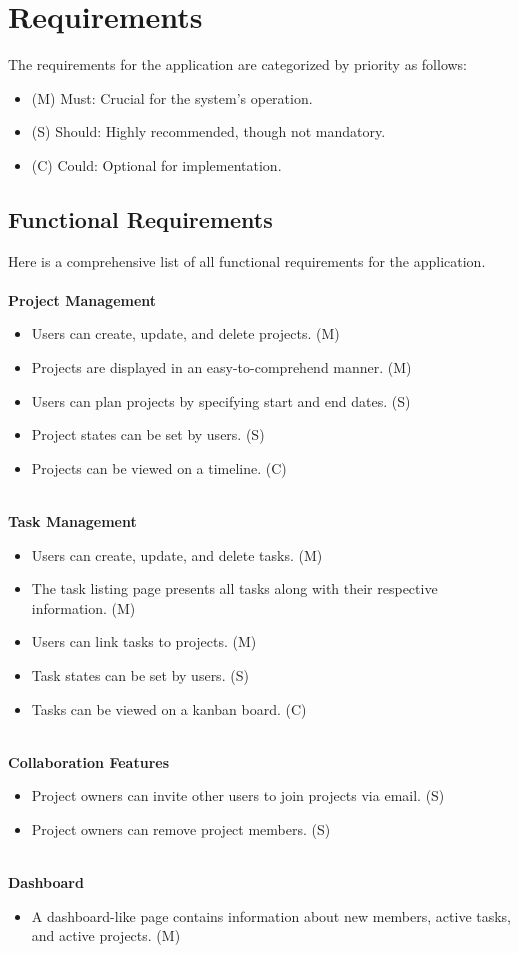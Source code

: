 \section{Requirements}
The requirements for the application are categorized by priority as follows:
\begin{itemize}
   \item (M) Must: Crucial for the system's operation.
   \item (S) Should: Highly recommended, though not mandatory.
   \item (C) Could: Optional for implementation.
\end{itemize}

\subsection{Functional Requirements}
Here is a comprehensive list of all functional requirements for the application.\\\\
\textbf{Project Management}
\begin{itemize}
   \item Users can create, update, and delete projects. (M)
   \item Projects are displayed in an easy-to-comprehend manner. (M)
   \item Users can plan projects by specifying start and end dates. (S)
   \item Project states can be set by users. (S)
   \item Projects can be viewed on a timeline. (C)
\end{itemize}
\  \\
\textbf{Task Management}
\begin{itemize}
   \item Users can create, update, and delete tasks. (M)
   \item The task listing page presents all tasks along with their respective information. (M)
   \item Users can link tasks to projects. (M)
   \item Task states can be set by users. (S)
   \item Tasks can be viewed on a kanban board. (C)
\end{itemize}
\  \\
\textbf{Collaboration Features}
\begin{itemize}
   \item Project owners can invite other users to join projects via email. (S)
   \item Project owners can remove project members. (S)
\end{itemize}
\  \\
\textbf{Dashboard}
\begin{itemize}
   \item A dashboard-like page contains information about new members, active tasks, and active projects. (M)
\end{itemize}

